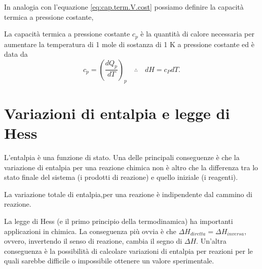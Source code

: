 In analogia con l'equazione \eqref{eq:cap.term.V.cost} possiamo definire la capacità termica a pressione costante,
\begin{defn}
     La capacità termica a pressione costante $c_p$ è la quantità di calore necessaria per aumentare la temperatura di 1 mole di sostanza di 1 K a pressione costante ed è data da
     \begin{equation}
         c_p=\left(\frac{dQ_p}{dT}\right)_p\quad\therefore\quad dH=c_PdT.
     \end{equation}
\end{defn}

\section{Variazioni di entalpia e legge di Hess}
L'entalpia è una funzione di stato. Una delle principali conseguenze è che la variazione di entalpia per una reazione chimica non è altro che la differenza tra lo
stato finale del sistema (i prodotti di reazione) e quello iniziale (i reagenti).
\begin{axiom}
    La variazione totale di entalpia,per una reazione è indipendente dal cammino di reazione.
\end{axiom}
La legge di Hess (e il primo principio della termodinamica) ha importanti applicazioni in chimica. La conseguenza più ovvia è che $\Delta H_{diretta}=\Delta H_{inversa}$, ovvero, invertendo il senso di reazione,
cambia il segno di $\Delta H$. Un'altra conseguenza è la possibilità di calcolare variazioni di entalpia per
reazioni per le quali sarebbe difficile o impossibile ottenere un valore sperimentale.
